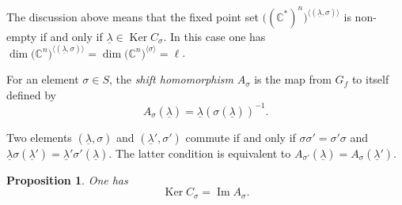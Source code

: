 \documentclass[11pt]{article}
\numberwithin{equation}{section}
\numberwithin{equation}{section}
\newtheorem{Proposition}[Theorem]{Proposition}
 { \theoremstyle{definition}
\newtheorem{Definition}[Theorem]{Definition}
\newtheorem{Remark}[Theorem]{Remark} }
\begin{document}
The discussion above means that the fixed point set $\big(({\mathbb C}^*)^n\big)^{\langle (\underline{\lambda},\sigma) \rangle}$
is non-empty if and only if $\underline{\lambda} \in \operatorname{Ker} C_\sigma$.
In this case one has $\dim \big({\mathbb C}^n\big)^{\langle (\underline{\lambda},\sigma) \rangle}=\dim \big({\mathbb C}^n\big)^{\langle \sigma \rangle}=\ell$.

\begin{Definition} For an element $\sigma \in S$, the {\em shift homomorphism} $A_\sigma$ is the map from $G_f$ to itself defined by
\[
A_\sigma(\underline{\lambda}) = \underline{\lambda}(\sigma(\underline{\lambda}))^{-1}.
\]
\end{Definition}

\begin{Remark} \label{rem:comm}
Two elements $(\underline{\lambda},\sigma)$ and $(\underline{\lambda}', \sigma')$ commute if and only if
$\sigma \sigma'=\sigma' \sigma$ and $\underline{\lambda}\sigma(\underline{\lambda}') =
\underline{\lambda}' \sigma'(\underline{\lambda})$. The latter condition is equivalent to
$A_{\sigma'}(\underline{\lambda})=A_\sigma(\underline{\lambda}')$.
\end{Remark}

\begin{Proposition} \label{prop:C=A}
One has
\[
\operatorname{Ker} C_\sigma = \operatorname{Im} A_\sigma.
\]
\end{Proposition}
\end{document}
